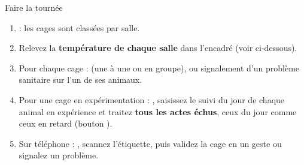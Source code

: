 \documentclass[11pt,a4paper]{article}
\begin{document}
\begin{procedure}{Faire la tournée}
\begin{enumerate}
  \item {} : les cages sont classées par
    salle.
  \item Relevez la \textbf{température de chaque salle} dans l'encadré
     (voir ci-dessous).
  \item Pour chaque cage :  (une à une ou en groupe), ou
    signalement d'un problème sanitaire sur l'un de ses animaux.
  \item Pour une cage en expérimentation : ,
    saisissez le suivi du jour de chaque animal en expérience et traitez
    \textbf{tous les actes échus}, ceux du jour comme ceux en retard
    (bouton ).
  \item Sur téléphone : , scannez
    l'étiquette, puis validez la cage en un geste ou signalez un problème.
\end{enumerate}
\end{procedure}
\end{document}
